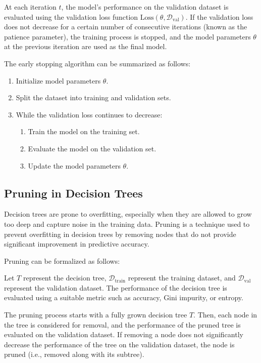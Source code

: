 \documentclass[12pt]{book} %
\begin{document}
At each iteration \( t \), the model's performance on the validation dataset is evaluated using the validation loss function \( \text{Loss}(\theta, \mathcal{D}_{\text{val}}) \). If the validation loss does not decrease for a certain number of consecutive iterations (known as the patience parameter), the training process is stopped, and the model parameters \( \theta \) at the previous iteration are used as the final model.

The early stopping algorithm can be summarized as follows:

\begin{enumerate}
    \item Initialize model parameters \( \theta \).
    \item Split the dataset into training and validation sets.
    \item While the validation loss continues to decrease:
    \begin{enumerate}
        \item Train the model on the training set.
        \item Evaluate the model on the validation set.
        \item Update the model parameters \( \theta \).
    \end{enumerate}
\end{enumerate}

\subsection{Pruning in Decision Trees}

Decision trees are prone to overfitting, especially when they are allowed to grow too deep and capture noise in the training data. Pruning is a technique used to prevent overfitting in decision trees by removing nodes that do not provide significant improvement in predictive accuracy.

Pruning can be formalized as follows:

Let \( T \) represent the decision tree, \( \mathcal{D}_{\text{train}} \) represent the training dataset, and \( \mathcal{D}_{\text{val}} \) represent the validation dataset. The performance of the decision tree is evaluated using a suitable metric such as accuracy, Gini impurity, or entropy.

The pruning process starts with a fully grown decision tree \( T \). Then, each node in the tree is considered for removal, and the performance of the pruned tree is evaluated on the validation dataset. If removing a node does not significantly decrease the performance of the tree on the validation dataset, the node is pruned (i.e., removed along with its subtree).
\end{document}
